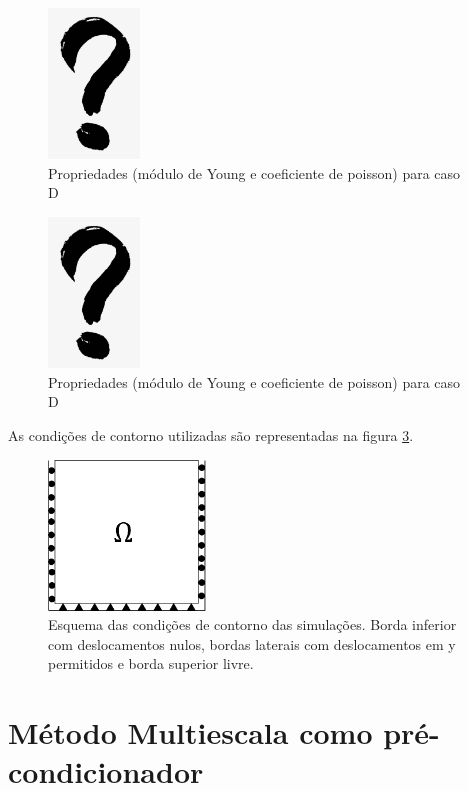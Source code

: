\begin{figure}[!htbp]
    \label{fig:casoDgrid}
    \centering
    \includegraphics[height=4cm]{interrogacao.png}
    \caption{Propriedades (módulo de Young e coeficiente de poisson) para caso D }
\end{figure}

\begin{figure}[!htbp]
    \label{fig:casoEgrid}
    \centering
    \includegraphics[height=4cm]{interrogacao.png}
    \caption{Propriedades (módulo de Young e coeficiente de poisson) para caso D }
\end{figure}


As condições de contorno utilizadas são representadas na figura \ref{fig:CondicoesContorno}. 

\begin{figure}[!htbp]
    \label{fig:CondicoesContorno}
    \centering
    \includegraphics[height=4cm]{chap08/figs/CondicoesContorno.png}
    \caption{Esquema das condições de contorno das simulações. Borda inferior com deslocamentos nulos, bordas laterais com deslocamentos em y permitidos e borda superior livre.}
\end{figure}


\section{Método Multiescala como pré-condicionador}

